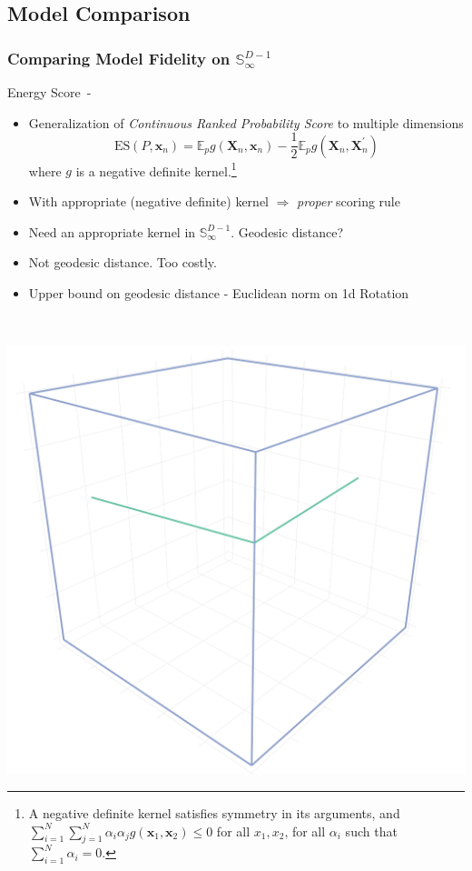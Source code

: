 \documentclass[aspectratio=169,10pt,notes]{beamer}
\begin{document}
\subsection{Model Comparison}

\begin{frame}
    \frametitle{Comparing Model Fidelity on $\mathbb{S}_{\infty}^{D-1}$}
    Energy Score~-~\cite{gneiting2007}
    \label{pgpareto:energyscore}
    \begin{minipage}{0.7\textwidth}
    {\footnotesize 
    \begin{itemize}
    \item Generalization of \emph{Continuous Ranked Probability Score} 
        to multiple dimensions
        \[
        \text{ES}\left(P,\bm{x}_n\right) =  
            \mathbb{E}_p g\left(\bm{X}_n, \bm{x}_n\right)
            - \frac{1}{2}\mathbb{E}_p g\left(\bm{X}_n,\bm{X}_n^{\prime}\right)
        \]
        where $g$ is a negative definite kernel.\footnote{A negative 
        definite kernel satisfies symmetry in its arguments, and 
        $\sum_{i = 1}^N\sum_{j = 1}^N \alpha_i\alpha_j g(\bm{x}_1,\bm{x}_2) \leq 0$ 
        for all $x_1,x_2$, for all $\alpha_i$ such that $\sum_{i = 1}^N\alpha_i = 0$.
        }
    \item With appropriate (negative definite) kernel 
        $\Longrightarrow$ \emph{proper} scoring rule
    \item Need an appropriate kernel in $\mathbb{S}_{\infty}^{D-1}$.  Geodesic distance?
    \item Not geodesic distance.  Too costly.
    \item Upper bound on geodesic distance - Euclidean norm on 1d Rotation
    \end{itemize}
    \vfill
    }
    \end{minipage}%
    ~\hfill
    \begin{minipage}{0.29\textwidth}
    \begin{center}
        \includegraphics[width=\textwidth]{ch1/images/1drot}

\end{center}
\end{minipage}
\end{frame}
\end{document}
